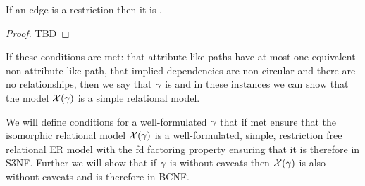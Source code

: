 \begin{lemma}
If an edge is a restriction then it is  .
\end{lemma}
\begin{proof}
TBD
\end{proof}

If these conditions are met: that attribute-like paths have at most one equivalent non attribute-like path, that implied dependencies are non-circular and there are no   relationships, then we say that $\gamma$ is  and in these instances we can show that 
the model $\mathcal{X}(\gamma)$ is a simple relational model. 

We will define conditions for a well-formulated $\gamma$  that if met ensure 
 that the isomorphic relational model $\mathcal{X}(\gamma)$ is a well-formulated, simple, restriction free relational ER model with the fd factoring property 
ensuring that it is therefore in S3NF.  Further we will show that if $\gamma$ is without caveats then $\mathcal{X}(\gamma)$ is also without caveats and is therefore in BCNF. 

